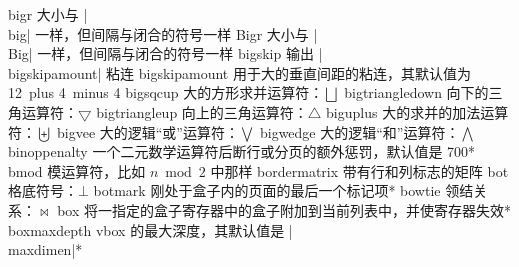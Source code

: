 \capcs bigr {大小与 |\\big| 一样，但间隔与闭合的符号一样}{}{}%
\capcs Bigr {大小与 |\\Big| 一样，但间隔与闭合的符号一样}{}{}%
\capcs bigskip {输出 |\\bigskipamount| 粘连}{}{}
\capcs bigskipamount {用于大的垂直间距的粘连，其默认值为 12\pt\ plus 4\pt\ minus 4\pt}{}{}
\capcs bigsqcup {大的方形求并运算符：$\bigsqcup$}{}{}%
\capcs bigtriangledown {向下的三角运算符：$\bigtriangledown$}{}{}
\capcs bigtriangleup {向上的三角运算符：$\bigtriangleup$}{}{}
\capcs biguplus {大的求并的加法运算符：$\biguplus$}{}{}
\capcs bigvee {大的逻辑“或”运算符：$\bigvee$}{}{}
\capcs bigwedge {大的逻辑“和”运算符：$\bigwedge$}{}{}
\capcs binoppenalty {一个二元数学运算符后断行或分页的额外惩罚，默认值是 700}*{}
\capcs bmod {模运算符，比如 $n \bmod 2$ 中那样}{}{}
\capcs bordermatrix {带有行和列标志的矩阵}{}{}
\capcs bot {格底符号：$\bot$}{}{}%
\capcs botmark {刚处于盒子内的页面的最后一个标记项}*{}%
\capcs bowtie {领结关系：$\bowtie$}{}{}%
\capcs box {将一指定的盒子寄存器中的盒子附加到当前列表中，并使寄存器失效}*{}
\capcs boxmaxdepth {vbox 的最大深度，其默认值是 |\\maxdimen|}*{}
